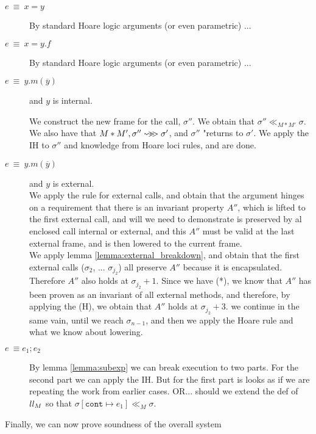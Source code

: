 \begin{description} 
\item[$e\ \equiv\ x=y $] 

By standard Hoare logic arguments (or even parametric) ...
\item[$e\ \equiv\ x=y.f $] 

By standard Hoare logic arguments (or even parametric) ...

 \item[$e\ \equiv\ y.m(\overline y)$]  
and $y$ is internal. 

We construct the new frame for the call, $\sigma''$. We obtain that $\sigma'' \ll_{M*M'} \sigma$. We also have that  $ M*M', \sigma'' \leadsto\!\! \!>\! \!> {\sigma'} $, and $\sigma''$ "returns to $\sigma'$.
We apply the IH to $\sigma''$ and knowledge from Hoare loci rules, and are done.  

\item[$e\ \equiv\ y.m(\overline y)$]  and $y$ is external. 
\\
We apply the rule for external calls, and obtain that the argument hinges on a requirement that there is an invariant property $A''$, which is lifted to the first external call, and will we need to demonstrate is preserved by al enclosed call internal or external, and this $A''$ must be valid at the last external frame, and is then lowered to the current frame.
\\
We apply lemma \ref{lemma:external_breakdown}, and obtain that the first external calls ($\sigma_2$, ... $\sigma_{j_2}$) all preserve $A''$ because it is encapsulated. Therefore $A''$ also holds at
$\sigma_{j_2}+1$. Since we have (*), we know that $A''$ has been proven as an invariant of all external methods, and therefore, by applying the (H), we obtain that $A''$ holds at $\sigma_{j_2} + 3$. we continue in the same vain, until we reach $\sigma_{n-1}$, and then we apply the Hoare rule and what we know about lowering.
 \item[$e\ \equiv e_1; e_2$ ]
 By lemma \ref{lemma:subexp} we can break execution to two parts. For the second part we can apply the IH. But for the first part is looks as if we are repeating the work from earlier cases. OR... should we extend the def of $\\ll_M$ so that $\sigma[\texttt{cont}\mapsto e_1] \ll_M \sigma$.
\end{description}


\vspace{1cm}

Finally, we can now prove soundness of the overall system

